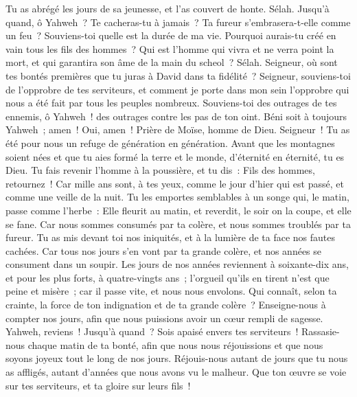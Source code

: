 \begin{multicols}{2}
Tu as abrégé les jours de sa jeunesse, et l'as couvert de honte. Sélah.
Jusqu'à quand, ô Yahweh~? Te cacheras-tu à jamais~? Ta fureur s'embrasera-t-elle comme un feu~?
Souviens-toi quelle est la durée de ma vie. Pourquoi aurais-tu créé en vain tous les fils des hommes~?
Qui est l'homme qui vivra et ne verra point la mort, et qui garantira son âme de la main du scheol~? Sélah.
Seigneur, où sont tes bontés premières que tu juras à David dans ta fidélité~?
Seigneur, souviens-toi de l'opprobre de tes serviteurs, et comment je porte dans mon sein l'opprobre qui nous a été fait par tous les peuples nombreux.
Souviens-toi des outrages de tes ennemis, ô Yahweh~! des outrages contre les pas de ton oint.
Béni soit à toujours Yahweh~; amen~! Oui, amen~!
\VerseOne{}Prière de Moïse, homme de Dieu. Seigneur~! Tu as été pour nous un refuge de génération en génération.
Avant que les montagnes soient nées et que tu aies formé la terre et le monde, d'éternité en éternité, tu es Dieu.
Tu fais revenir l'homme à la poussière, et tu dis~: Fils des hommes, retournez~!
Car mille ans sont, à tes yeux, comme le jour d'hier qui est passé, et comme une veille de la nuit.
Tu les emportes semblables à un songe qui, le matin, passe comme l'herbe~:
Elle fleurit au matin, et reverdit, le soir on la coupe, et elle se fane.
Car nous sommes consumés par ta colère, et nous sommes troublés par ta fureur.
Tu as mis devant toi nos iniquités, et à la lumière de ta face nos fautes cachées.
Car tous nos jours s'en vont par ta grande colère, et nos années se consument dans un soupir.
Les jours de nos années reviennent à soixante-dix ans, et pour les plus forts, à quatre-vingts ans~; l'orgueil qu'ils en tirent n'est que peine et misère~; car il passe vite, et nous nous envolons.
Qui connaît, selon ta crainte, la force de ton indignation et de ta grande colère~?
Enseigne-nous à compter nos jours, afin que nous puissions avoir un cœur rempli de sagesse.
Yahweh, reviens~! Jusqu'à quand~? Sois apaisé envers tes serviteurs~!
Rassasie-nous chaque matin de ta bonté, afin que nous nous réjouissions et que nous soyons joyeux tout le long de nos jours.
Réjouis-nous autant de jours que tu nous as affligés, autant d'années que nous avons vu le malheur.
Que ton œuvre se voie sur tes serviteurs, et ta gloire sur leurs fils~!

\end{multicols}
